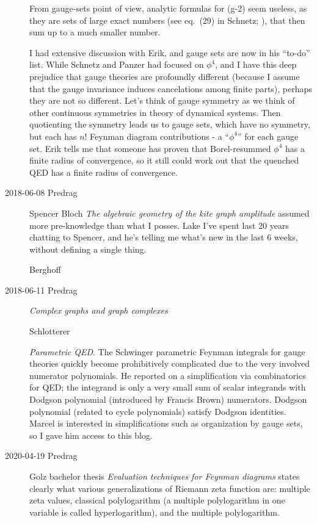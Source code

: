 \begin{description}
From gauge-sets point of view, analytic formulas for (g-2) seem useless,
as they are sets of large exact numbers (see eq.~(29) in
Schnetz; ), that then sum up to a
much smaller number.

I had extensive discussion with Erik, and gauge sets are now in his
``to-do'' list. While Schnetz and Panzer had focused on $\phi^4$, and I
have this deep prejudice that gauge theories are profoundly different
(because I assume that the gauge invariance induces cancelations among
finite parts), perhaps they are not so different. Let's think of gauge
symmetry as we think of other continuous symmetries in theory of
dynamical systems. Then quotienting the symmetry leads us to gauge sets,
which have no symmetry, but each has $n!$ Feynman diagram contributions -
a ``$\phi^4$'' for each gauge set. Erik tells me that someone has proven
that Borel-resummed $\phi^4$ has a finite radius of convergence, so it
still could work out that the quenched QED has a finite radius of
convergence.


\item[2018-06-08 Predrag]

Spencer Bloch {\em The algebraic geometry of the kite graph amplitude}
assumed more pre-knowledge than what I posses. Lake I've spent last 20
years chatting to Spencer, and he's telling me what's new in the last 6
weeks, without defining a single thing.

Berghoff

\item[2018-06-11 Predrag]

 {\em Complex graphs and graph complexes}

Schlotterer

{\em Parametric QED}.
The Schwinger parametric Feynman integrals for gauge theories quickly
become prohibitively complicated due to the very involved numerator
polynomials. He reported on a simplification via combinatorics for QED;
the integrand is only a very small sum of scalar integrands with Dodgson
polynomial (introduced by Francis Brown) numerators. Dodgson polynomial
(related to cycle polynomials) satisfy Dodgson identities. Marcel is
interested in simplifications such as organization by gauge sets, so I
gave him access to this blog.

\item[2020-04-19 Predrag] Golz
{bachelor thesis} {\em Evaluation techniques for Feynman diagrams}
states clearly what various generalizations of Riemann zeta function are:
multiple zeta values,
classical polylogarithm (a multiple polylogarithm in one variable is
called hyperlogarithm),
and the multiple polylogarithm.


\end{description}
